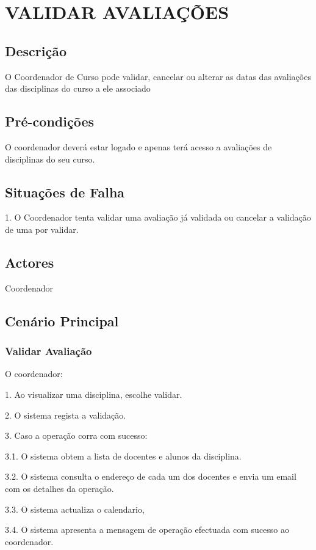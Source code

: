 \section{VALIDAR AVALIAÇÕES}

\subsection{Descrição}
O Coordenador de Curso pode validar, cancelar ou alterar as datas das avaliações das disciplinas do curso a ele associado 	

\subsection{Pré-condições}
O coordenador deverá estar logado e apenas terá acesso a avaliações de disciplinas do seu curso.

\subsection{Situações de Falha}
1. O Coordenador tenta validar uma avaliação já validada ou cancelar a validação de uma por validar.

\subsection{Actores}
Coordenador

\subsection{Cenário Principal}

\subsubsection{Validar Avaliação} 
O coordenador:

1. Ao visualizar uma disciplina, escolhe validar.

2. O sistema regista a validação.

3. Caso a operação corra com sucesso:

3.1. O sistema obtem a lista de docentes e alunos da disciplina.

3.2. O sistema consulta o endereço de cada um dos docentes e envia um email com os detalhes da operação.

3.3. O sistema actualiza o calendario,

3.4. O sistema apresenta a mensagem de operação efectuada com sucesso ao coordenador.

